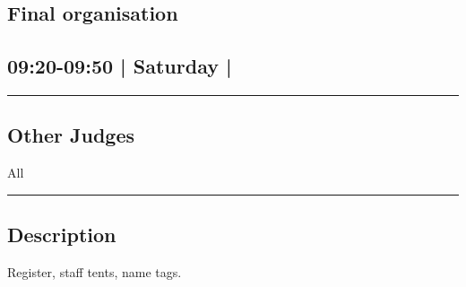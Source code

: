 \documentclass[10pt, A5]{article}
\begin{document}
		\begin{framed}
			\begin{minipage}{\textwidth}

			\setcounter{section}{14}
							\section{Final organisation}
						
			\subsection*{09:20-09:50 | Saturday | }

			\vspace{0.25cm}
			\hrule
			\vspace{0.25cm}


			\subsection*{Other Judges}
							All

					\vspace{0.25cm}
			\hrule
			\vspace{0.25cm}

			\begin{minipage}{\textwidth}
			\subsection*{\faListAlt \: Description}
			Register, staff tents, name tags.
			\end{minipage}


	\end{minipage}
	\end{framed}

	
\end{document}
